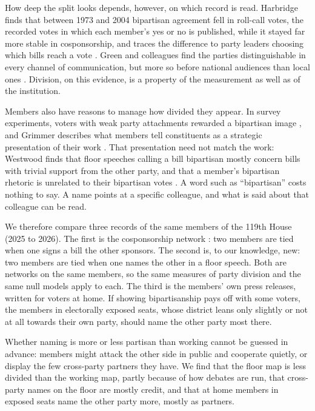 \documentclass[9pt,twocolumn,twoside]{pnas-new}
\begin{document}
How deep the split looks depends, however, on which record is read. Harbridge finds that between 1973 and 2004
bipartisan agreement fell in roll-call votes, the recorded votes in which each member's yes or no is published,
while it stayed far more stable in cosponsorship, and traces the difference to party leaders choosing which bills
reach a vote \cite{harbridge2015}. Green and colleagues find the parties distinguishable in every channel of
communication, but more so before national audiences than local ones \cite{green2024}. Division, on this evidence,
is a property of the measurement as well as of the institution.

Members also have reasons to manage how divided they appear. In survey experiments, voters with weak party
attachments rewarded a bipartisan image \cite{harbridge2011}, and Grimmer describes what members tell constituents
as a strategic presentation of their work \cite{grimmer2013}. That presentation need not match the work: Westwood
finds that floor speeches calling a bill bipartisan mostly concern bills with trivial support from the other party,
and that a member's bipartisan rhetoric is unrelated to their bipartisan votes \cite{westwood2022}. A word such as
``bipartisan'' costs nothing to say. A name points at a specific colleague, and what is said about that colleague
can be read.

We therefore compare three records of the same members of the 119th House (2025 to 2026). The first is the
cosponsorship network \cite{fowler2006}: two members are tied when one signs a bill the other sponsors. The second
is, to our knowledge, new: two members are tied when one names the other in a floor speech. Both are networks on the
same members, so the same measures of party division and the same null models apply to each. The third is the
members' own press releases, written for voters at home. If showing bipartisanship pays off with some voters, the
members in electorally exposed seats, whose district leans only slightly or not at all towards their own party,
should name the other party most there.

Whether naming is more or less partisan than working cannot be guessed in\Parasplit
advance: members might attack the other side in public and cooperate quietly, or display the few cross-party partners they have. We find that the floor map
is less divided than the working map, partly because of how debates are run, that cross-party names on the floor
are mostly credit, and that at home members in exposed seats name the other party more, mostly as partners.
\end{document}

